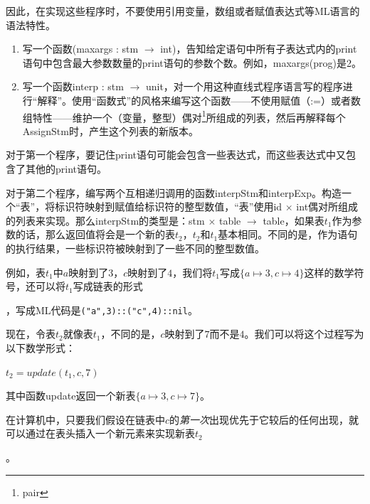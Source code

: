 \documentclass[cn,11pt,chinese]{elegantbook}
\begin{document}
因此，在实现这些程序时，不要使用引用变量，数组或者赋值表达式等ML语言的语法特性。

\begin{enumerate}
  \item 写一个函数(maxargs : stm $\rightarrow$ int)，告知给定语句中所有子表达式内的print语句中包含最大参数数量的print语句的参数个数。例如，maxargs(prog)是2。
  \item 写一个函数interp : stm $\rightarrow$ unit，对一个用这种直线式程序语言写的程序进行“解释”。使用“函数式”的风格来编写这个函数——不使用赋值（:=）或者数组特性——维护一个（变量，整型）偶对\footnote{pair}所组成的列表，然后再解释每个AssignStm时，产生这个列表的新版本。
\end{enumerate}

对于第一个程序，要记住print语句可能会包含一些表达式，而这些表达式中又包含了其他的print语句。

对于第二个程序，编写两个互相递归调用的函数interpStm和interpExp。构造一个“表”，将标识符映射到赋值给标识符的整型数值，“表”使用id $\times$ int偶对所组成的列表来实现。那么interpStm的类型是：stm $\times$ table $\rightarrow$ table，如果表$t_1$作为参数的话，那么返回值将会是一个新的表$t_2$，$t_2$和$t_1$基本相同。不同的是，作为语句的执行结果，一些标识符被映射到了一些不同的整型数值。

例如，表$t_1$中$a$映射到了$3$，$c$映射到了$4$，我们将$t_1$写成$\{a \mapsto 3,c \mapsto 4\}$这样的数学符号，还可以将$t_1$写成链表的形式
，写成ML代码是\texttt{("a",3)::("c",4)::nil}。

现在，令表$t_2$就像表$t_1$，不同的是，$c$映射到了$7$而不是$4$。我们可以将这个过程写为以下数学形式：

$t_2=update(t_1,c,7)$

其中函数update返回一个新表$\{a \mapsto 3,c \mapsto 7\}$。

在计算机中，只要我们假设在链表中$c$的\textit{第一次}出现优先于它较后的任何出现，就可以通过在表头插入一个新元素来实现新表$t_2$
。
\end{document}
